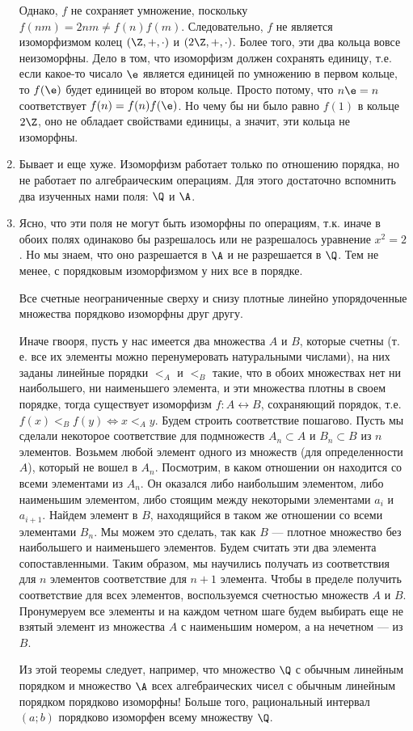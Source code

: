 \begin{enumerate}
Однако, $f$ не сохраняет умножение, поскольку $f(nm)=2nm\ne f(n)f(m)$. Следовательно, $f$ не является изоморфизмом колец $(\Z,+,\cdot)$ и $(2\Z,+,\cdot)$. Более того, эти два кольца вовсе неизоморфны. Дело в том, что изоморфизм должен сохранять единицу, т.е. если какое-то чисало $\e$ является единицей по умножению в первом кольце, то $f(\e)$ будет единицей во втором кольце. Просто потому, что $n\e=n$ соответствует $f(n)=f(n)f(\e)$. Но чему бы ни было равно $f(1)$ в кольце $2\Z$, оно не обладает свойствами единицы, а значит, эти кольца не изоморфны.
\item Бывает и еще хуже. Изоморфизм работает только по отношению порядка, но не работает по алгебраическим операциям. Для этого достаточно вспомнить два изученных нами поля: $\Q$ и $\A$.
\item Ясно, что эти поля не могут быть изоморфны по операциям, т.к. иначе в обоих полях одинаково бы разрешалось или не разрешалось уравнение $x^2=2$. Но мы знаем, что оно разрешается в $\A$ и не разрешается в $\Q$. Тем не менее, с порядковым изоморфизмом у них все в порядке.
\begin{thrm} Все счетные неограниченные сверху и снизу плотные линейно упорядоченные множества порядково изоморфны друг другу.\end{thrm}
Иначе гвооря, пусть у нас имеется два множества $A$ и $B$, которые счетны (т.\,е. все их элементы можно перенумеровать натуральными числами), на них заданы линейные порядки $<_A$ и $<_B$ такие, что в обоих множествах нет ни наибольшего, ни наименьшего элемента, и эти множества плотны в своем порядке, тогда существует изоморфизм $f:A\leftrightarrow B$, сохраняющий порядок, т.е. $f(x)<_Bf(y)\Leftrightarrow x<_Ay$.
\pf
Будем строить соответствие пошагово. Пусть мы сделали некоторое соответствие для подмножеств $A_n\subset A$ и $B_n\subset B$ из $n$ элементов. Возьмем любой элемент одного из множеств (для определенности $A$), который не вошел в $A_n$. Посмотрим, в каком отношении он находится со всеми элементами из $A_n$. Он оказался либо наибольшим элементом, либо наименьшим элементом, либо стоящим между некоторыми элементами $a_i$ и $a_{i+1}$. Найдем элемент в $B$, находящийся в таком же отношении со всеми элементами $B_n$. Мы можем это сделать, так как $B$ --- плотное множество без наибольшего и наименьшего элементов. Будем считать эти два элемента сопоставленными. Таким образом, мы научились получать из соответствия для $n$ элементов соответствие для $n+1$ элемента. Чтобы в пределе получить соответствие для всех элементов, воспользуемся счетностью множеств $A$ и $B$. Пронумеруем все элементы и на каждом четном шаге будем выбирать еще не взятый элемент из множества $A$ с наименьшим номером, а на нечетном --- из $B$.
\epf

Из этой теоремы следует, например, что множество $\Q$ с обычным линейным порядком и множество $\A$ всех алгебраических чисел с обычным линейным порядком порядково изоморфны! Больше того, рациональный интервал $(a;b)$ порядково изоморфен всему множеству  $\Q$.
\end{enumerate}



